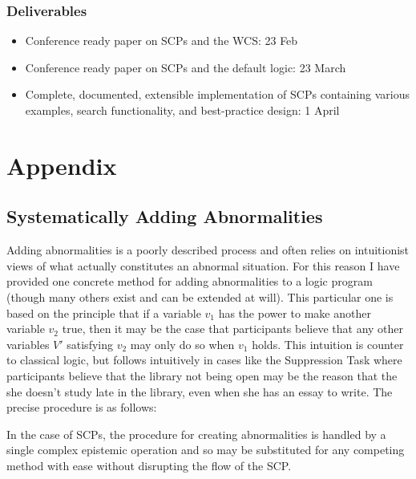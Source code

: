 \documentclass{article}
\begin{document}
\subsubsection*{Deliverables}
\begin{itemize}
\item Conference ready paper on SCPs and the WCS: 23 Feb
\item Conference ready paper on SCPs and the default logic: 23 March
\item Complete, documented, extensible implementation of SCPs containing various examples, search functionality, and best-practice design: 1 April
\end{itemize}
	



\newpage

\section{Appendix}

\subsection{Systematically Adding Abnormalities} \label{ssec: addAbnormalities}
Adding abnormalities is a poorly described process and often relies on intuitionist views of what actually constitutes an abnormal situation. For this reason I have provided one concrete method for adding abnormalities to a logic program (though many others exist and can be extended at will). This particular one is based on the principle that if a variable $v_1$ has the power to make another variable $v_2$ true, then it may be the case that participants believe that any other variables $V'$ satisfying $v_2$ may only do so when $v_1$ holds. This intuition is counter to classical logic, but follows intuitively in cases like the Suppression Task where participants believe that the library not being open may be the reason that the she doesn't study late in the library, even when she has an essay to write. The precise procedure is as follows:


In the case of SCPs, the procedure for creating abnormalities is handled by a single complex epistemic operation and so may be substituted for any competing method with ease without disrupting the flow of the SCP.
\end{document}
